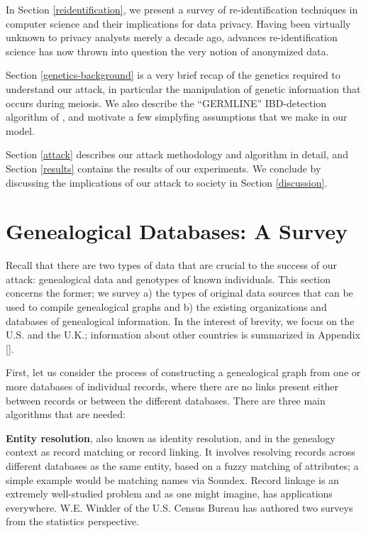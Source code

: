 \documentclass{article}
\begin{document}
 In Section \ref{reidentification}, we present a survey of re-identification techniques in computer science and their implications for data privacy. Having been virtually unknown to privacy analysts merely a decade ago, advances re-identification science has now thrown into question the very notion of anonymized data.

Section \ref{genetics-background} is a very brief recap of the genetics required to understand our attack, in particular the manipulation of genetic information that occurs during meiosis. We also describe the ``GERMLINE'' IBD-detection algorithm of \cite{germline}, and motivate a few simplyfing assumptions that we make in our model.

Section \ref{attack} describes our attack methodology and algorithm in detail, and Section \ref{results} contains the results of our experiments. We conclude by discussing the implications of our attack to society in Section \ref{discussion}.






\section{Genealogical Databases: A Survey}
\label{genealogy-survey}
Recall that there are two types of data that are crucial to the success of our attack: genealogical data and  genotypes of known individuals. This section concerns the former; we survey a) the types of original data sources that can be used to compile genealogical graphs and b) the existing organizations and databases of genealogical information. 
In the interest of brevity, we focus on the U.S. and the U.K.; information about other countries is summarized in Appendix [].

First, let us consider the process of constructing a genealogical graph from one or more databases of individual records, where there are no links present either between records or between the different databases.  There are three main algorithms that are needed:

{\bf Entity resolution}, also known as identity resolution, and in the genealogy context as record matching or record linking. It involves resolving records across different databases as the same entity, based on a fuzzy matching of attributes; a simple example would be matching names via Soundex. Record linkage is an extremely well-studied problem and as one might imagine, has applications everywhere. W.E. Winkler of the U.S. Census Bureau has authored two surveys \cite{winkler-survey-99,winkler-survey-06} from the statistics perspective.
\end{document}
